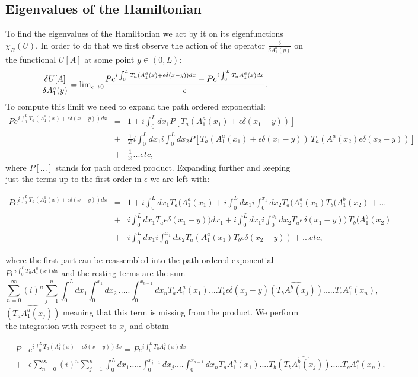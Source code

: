 \documentclass[11pt]{report}
\theoremstyle{plain}
\theoremstyle{definition}
\theoremstyle{remark}
\theoremstyle{remark}
\numberwithin{equation}{section}
\begin{document}
\subsection{Eigenvalues of the Hamiltonian}


To find the eigenvalues of the Hamiltonian we act by it on its eigenfunctions $\chi_R(U)$.
In order to do that we first observe the action of the operator $\frac{\delta}{\delta A^a_1(y)}$ on the functional $U[A]$ at some point $y\in (0,L)$:
%
$$
\frac{\delta U[A]}{\delta A^a_1(y)}  =   {\rm lim}_{\epsilon \to 0}\frac{P e^{i\int_0^L T_a(A^a_1(x) + \epsilon \delta(x-y))dx} - P e^{i\int_0^L T_aA^a_1(x)dx}}{\epsilon}.
$$
To compute this limit we need to expand the path ordered exponential:
%
$$
\begin{array}{lll}
P e^{i\int_0^L T_a(A^a_1(x) + \epsilon \delta(x-y))dx} & = & 1 + i\int_0^L dx_1 P[T_a(A^a_1(x_1) + \epsilon \delta(x_1-y))] \\
& + & \frac{1}{2!}i\int_0^L dx_1 i\int_0^L dx_2P[T_a(A^a_1(x_1) +\epsilon \delta(x_1-y)) \, T_a(A^a_1(x_2) \epsilon \delta(x_2-y))] \\
&+& \frac{1}{3!}...etc,
\end{array}
$$
where $P[...]$ stands for path ordered product. Expanding further and keeping just the terms up to the first order in $\epsilon$ we are left with:
%
\begin{spacing}{1.45}
$
\begin{array}{lll}
P e^{i\int_0^L T_a(A^a_1(x) + \epsilon \delta(x-y))dx} & = & 1 + i\int_0^L dx_1T_a(A^a_1(x_1) + i\int_0^L dx_1 i\int_0^{x_1} dx_2T_a(A^a_1(x_1) T_b(A^b_1(x_2) + ... \\
&+& i\int_0^L dx_1T_a\epsilon \delta(x_1-y))dx_1 +  i\int_0^L dx_1 i\int_0^{x_1} dx_2T_a\epsilon \delta(x_1-y)) \, T_b(A^b_1(x_2) \\
 &+& i\int_0^L dx_1 i\int_0^{x_1} dx_2 T_a(A^a_1(x_1)T_b\epsilon \delta(x_2-y)) + ...etc,
\end{array}
$
\end{spacing}
where the first part can be reassembled into the path ordered exponential $P e^{i\int_0^L T_aA^a_1(x)dx}$ and the resting terms are the sum
%
$$
\sum_{n=0}^{\infty} (i)^n\sum_{j=1}^n \int_0^L dx_1 \int_0^{x_1} dx_2 \, ..... \int_0^{x_{n-1}} dx_n T_aA^a_1(x_1)....T_b\epsilon \delta (x_j - y) \widehat{(T_bA^b_1(x_j))}.....T_cA^c_1(x_n),
$$
$\widehat{(T_aA^a_1(x_j))}$ meaning that this term is missing from the product. We perform the integration with respect to $x_j$ and obtain
%
\begin{spacing}{1.45}
$
\begin{array}{lll}
&P& e^{i\int_0^L T_a(A^a_1(x) + \epsilon \delta(x-y))dx} = P e^{i\int_0^L T_aA^a_1(x)dx} \\
&+& \epsilon  \sum_{n=0}^{\infty} (i)^n \sum_{j=1}^n \int_0^L dx_1 .....\widehat{\int_0^{x_{j-1}} dx_j}.... \int_0^{x_{n-1}} dx_n T_aA^a_1(x_1)....T_b\widehat{(T_bA^b_1(x_j))}.....T_cA^c_1(x_n).
\end{array}
$
\end{spacing}
\end{document}
